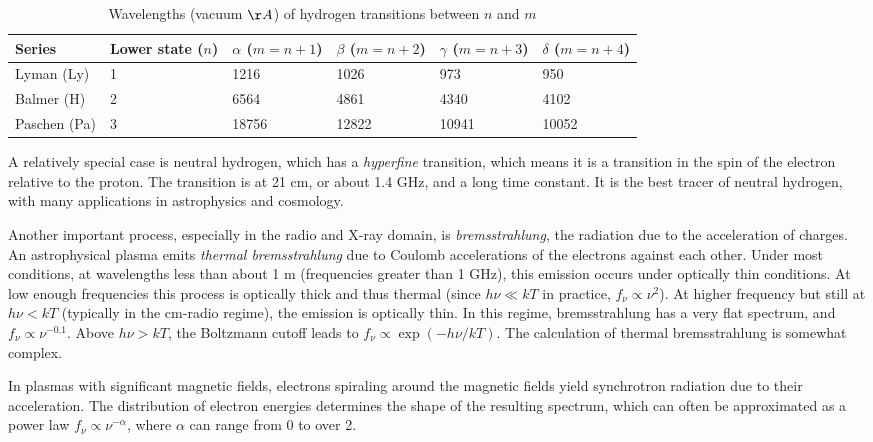 \begin{table}[htp]
\caption{
\label{table:hydrogen} Wavelengths (vacuum $\AA$) of hydrogen transitions between $n$ and $m$}
\begin{tabular}{llllll}
\hline\hline
Series & Lower state ($n$) & $\alpha$ ($m = n+1$) & $\beta$ ($m=n+2$)
& $\gamma$ ($m=n+3$) & $\delta$ ($m=n+4$) \\
\hline
Lyman (Ly) & 1 & 1216 & 1026	& 973	& 950 \\
Balmer (H) & 2 & 6564 & 4861	& 4340	& 4102 \\
Paschen (Pa) & 3 & 18756 & 12822	& 10941	& 10052 \\
\hline
\end{tabular}
\end{table}

A relatively special case is neutral hydrogen, which has a {\it
hyperfine} transition, which means it is a transition in the spin of
the electron relative to the proton. The transition is at 21 cm, or
about 1.4 GHz, and a long time constant. It is the best tracer of
neutral hydrogen, with many applications in astrophysics and
cosmology.

Another important process, especially in the radio and X-ray domain,
is {\it bremsstrahlung}, the radiation due to the acceleration of
charges. An astrophysical plasma emits {\it thermal bremsstrahlung}
due to Coulomb accelerations of the electrons against each
other. Under most conditions, at wavelengths less than about 1 m
(frequencies greater than 1 GHz), this emission occurs under optically
thin conditions. At low enough frequencies this process is optically
thick and thus thermal (since $h\nu \ll kT$ in practice,
$f_\nu\propto \nu^2$). At higher frequency but still at $h\nu < kT$
(typically in the cm-radio regime), the emission is optically thin. In
this regime, bremsstrahlung has a very flat spectrum, and
$f_\nu\propto \nu^{-0.1}$. Above $h\nu> kT$, the Boltzmann cutoff
leads to $f_\nu\propto \exp(-h\nu/kT)$. The calculation of thermal
bremsstrahlung is somewhat complex.

In plasmas with significant magnetic fields, electrons spiraling
around the magnetic fields yield synchrotron radiation due to their
acceleration. The distribution of electron energies determines the
shape of the resulting spectrum, which can often be approximated as a
power law $f_\nu \propto \nu^{-\alpha}$, where $\alpha$ can range from
0 to over 2.

